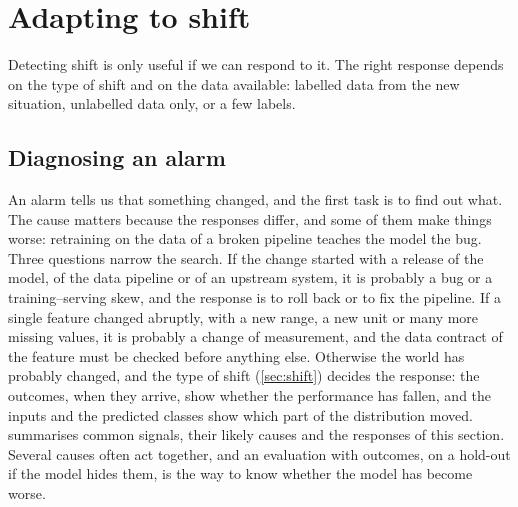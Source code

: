 \section{Adapting to shift}\label{sec:adapt}

Detecting shift is only useful if we can respond to it. The right response depends on the type of shift and on
the data available: labelled data from the new situation, unlabelled data only, or a few labels.

\subsection{Diagnosing an alarm}\label{sec:diagnose}

An alarm tells us that something changed, and the first task is to find out what. The cause matters
because the responses differ, and some of them make things worse: retraining on the data of a broken
pipeline teaches the model the bug. Three questions narrow the search. If the change started with a
release of the model, of the data pipeline or of an upstream system, it is probably a bug or a
training--serving skew, and the response is to roll back or to fix the pipeline. If a single feature
changed abruptly, with a new range, a new unit or many more missing values, it is probably a change of
measurement, and the data contract of the feature must be checked before anything else. Otherwise the
world has probably changed, and the type of shift (\cref{sec:shift}) decides the response: the outcomes,
when they arrive, show whether the performance has fallen, and the inputs and the predicted classes show
which part of the distribution moved.  summarises common signals, their likely causes
and the responses of this section. Several causes often act together, and an evaluation with outcomes,
on a hold-out if the model hides them, is the way to know whether the model
has become worse.

